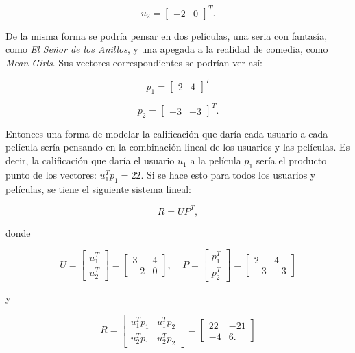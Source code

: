 \[
     u_2 = 
     \begin{bmatrix}
         -2 & 0
    \end{bmatrix}^{T}.
\]
  
De la misma forma se podría pensar en dos películas, una seria con fantasía, como \textit{El Señor de los Anillos}, y una apegada a la realidad de comedia, como \textit{Mean Girls}. Sus vectores correspondientes se podrían ver así:

\[
    p_1 = 
    \begin{bmatrix}
         2 & 4
    \end{bmatrix}^{T}
\]


\[
    p_2 = 
    \begin{bmatrix}
         -3 & -3
    \end{bmatrix}^{T}.
\]

Entonces una forma de modelar la calificación que daría cada usuario a cada película sería pensando en la combinación lineal de los usuarios y las películas. Es decir, la calificación que daría el usuario $u_1$ a la película $p_1$ sería el producto punto de los vectores: $u_1^T p_1 = 22$. Si se hace esto para todos los usuarios y películas, se tiene el siguiente sistema lineal:

\[
    R = UP^T,
\]


donde

\[
    U = 
    \begin{bmatrix}
         u_1^T \\ 
         u_2^T
    \end{bmatrix} =
    \begin{bmatrix}
         3 & 4 \\ 
         -2 & 0
    \end{bmatrix},\;\;\;\;
    P = 
    \begin{bmatrix}
         p_1^T \\ 
         p_2^T
    \end{bmatrix} =
    \begin{bmatrix}
         2 & 4 \\ 
         -3 & -3
    \end{bmatrix}
\]

y

\[
    R = 
    \begin{bmatrix}
         u_1 ^T p_1 & u_1 ^T p_2 \\ 
         u_2 ^T p_1 & u_2 ^T p_2
    \end{bmatrix}
    =
    \begin{bmatrix}
        22 & -21 \\
        -4 & 6.
    \end{bmatrix}
\]

